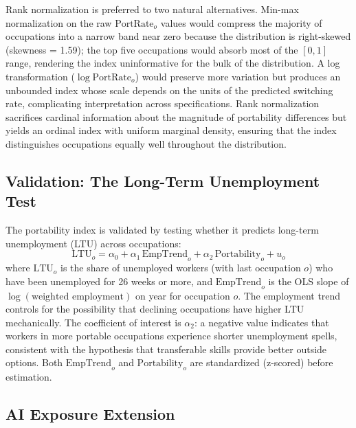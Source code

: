 \documentclass[12pt]{article}
\begin{document}
Rank normalization is preferred to two natural alternatives. Min-max normalization on the raw $\text{PortRate}_o$ values would compress the majority of occupations into a narrow band near zero because the distribution is right-skewed (skewness = 1.59); the top five occupations would absorb most of the $[0,1]$ range, rendering the index uninformative for the bulk of the distribution. A log transformation ($\log \text{PortRate}_o$) would preserve more variation but produces an unbounded index whose scale depends on the units of the predicted switching rate, complicating interpretation across specifications. Rank normalization sacrifices cardinal information about the magnitude of portability differences but yields an ordinal index with uniform marginal density, ensuring that the index distinguishes occupations equally well throughout the distribution.

\subsection{Validation: The Long-Term Unemployment Test}
\label{sec:strategy_ltu}

The portability index is validated by testing whether it predicts long-term unemployment (LTU) across occupations:
\begin{equation}
\label{eq:ltu}
\text{LTU}_o = \alpha_0 + \alpha_1 \, \text{EmpTrend}_o + \alpha_2 \, \text{Portability}_o + u_o
\end{equation}
where $\text{LTU}_o$ is the share of unemployed workers (with last occupation $o$) who have been unemployed for 26 weeks or more, and $\text{EmpTrend}_o$ is the OLS slope of $\log(\text{weighted employment})$ on year for occupation $o$. The employment trend controls for the possibility that declining occupations have higher LTU mechanically. The coefficient of interest is $\alpha_2$: a negative value indicates that workers in more portable occupations experience shorter unemployment spells, consistent with the hypothesis that transferable skills provide better outside options. Both $\text{EmpTrend}_o$ and $\text{Portability}_o$ are standardized (z-scored) before estimation.

\subsection{AI Exposure Extension}
\label{sec:strategy_ai}
\end{document}
